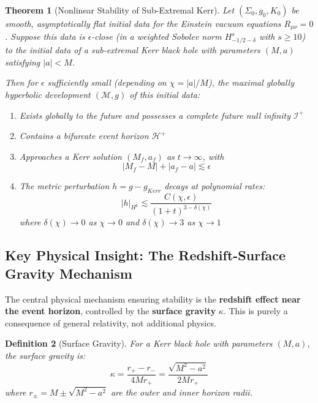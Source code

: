 \documentclass[12pt,a4paper]{article}
\newtheorem{theorem}{Theorem}[section]
\newtheorem{definition}[theorem]{Definition}
\newcommand{\M}{\mathcal{M}}
\begin{document}
\begin{theorem}[Nonlinear Stability of Sub-Extremal Kerr]\label{thm:main}
Let $(\Sigma_0, g_0, K_0)$ be smooth, asymptotically flat initial data for the Einstein vacuum equations $R_{\mu\nu} = 0$. Suppose this data is $\epsilon$-close (in a weighted Sobolev norm $H^s_{-1/2-\delta}$ with $s \geq 10$) to the initial data of a sub-extremal Kerr black hole with parameters $(M, a)$ satisfying $|a| < M$.

Then for $\epsilon$ sufficiently small (depending on $\chi = |a|/M$), the maximal globally hyperbolic development $(\M, g)$ of this initial data:
\begin{enumerate}[label=(\roman*)]
    \item Exists globally to the future and possesses a complete future null infinity $\mathscr{I}^+$
    \item Contains a bifurcate event horizon $\mathcal{H}^+$
    \item Approaches a Kerr solution $(M_f, a_f)$ as $t \to \infty$, with
    \begin{equation}
    |M_f - M| + |a_f - a| \lesssim \epsilon
    \end{equation}
    \item The metric perturbation $h = g - g_{Kerr}$ decays at polynomial rates:
    \begin{equation}
    |h|_{H^k} \lesssim \frac{C(\chi, \epsilon)}{(1+t)^{3-\delta(\chi)}}
    \end{equation}
    where $\delta(\chi) \to 0$ as $\chi \to 0$ and $\delta(\chi) \to 3$ as $\chi \to 1$
\end{enumerate}
\end{theorem}

\subsection{Key Physical Insight: The Redshift-Surface Gravity Mechanism}

The central physical mechanism ensuring stability is the \textbf{redshift effect near the event horizon}, controlled by the \textbf{surface gravity} $\kappa$. This is purely a consequence of general relativity, not additional physics.

\begin{definition}[Surface Gravity]
For a Kerr black hole with parameters $(M, a)$, the surface gravity is:
\begin{equation}
\kappa = \frac{r_+ - r_-}{4Mr_+} = \frac{\sqrt{M^2 - a^2}}{2Mr_+}
\end{equation}
where $r_\pm = M \pm \sqrt{M^2 - a^2}$ are the outer and inner horizon radii.
\end{definition}
\end{document}

